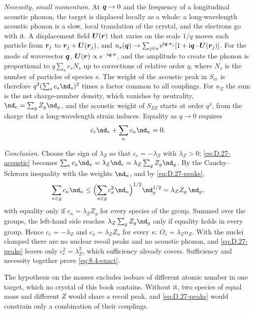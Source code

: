 \emph{Necessity, small momentum.} At $\bm{q} \to 0$ and the frequency of a longitudinal acoustic phonon, the target is displaced locally as a whole: a long-wavelength acoustic phonon is a slow, local translation of the crystal, and the electrons go with it. A displacement field $\bm{U}(\bm{r})$ that varies on the scale $1/q$ moves each particle from $\bm{r}_j$ to $\bm{r}_j + \bm{U}(\bm{r}_j)$, and $n_s(\bm{q}) \to \sum_{j\in s}\mathrm{e}^{\mathrm{i}\bm{q}\cdot\bm{r}_j}[1 + \mathrm{i}\bm{q}\cdot\bm{U}(\bm{r}_j)]$. For the mode of wavevector $\bm{q}$, $\bm{U}(\bm{r}) \propto \mathrm{e}^{-\mathrm{i}\bm{q}\cdot\bm{r}}$, and the amplitude to create the phonon is proportional to $q\sum_sc_sN_s$ up to corrections of relative order $q$, where $N_s$ is the number of particles of species $s$. The weight of the acoustic peak in $S_{cc}$ is therefore $q^2(\sum_sc_s\nd_s)^2$ times a factor common to all couplings. For $n_Z$ the sum is the net charge-number density, which vanishes by neutrality, $\nd_e = \sum_gZ_g\nd_g$, and the acoustic weight of $S_{ZZ}$ starts at order $q^4$, from the charge that a long-wavelength strain induces. Equality as $q \to 0$ requires
\begin{equation}
  c_e\nd_e + \sum_\kappa c_\kappa\nd_\kappa = 0 .
  \label{eq:D.27-acoustic}
\end{equation}

\emph{Conclusion.} Choose the sign of $\lambda_Z$ so that $c_e = -\lambda_Z$ with $\lambda_Z > 0$; \cref{eq:D.27-acoustic} becomes $\sum_\kappa c_\kappa\nd_\kappa = \lambda_Z\nd_e = \lambda_Z\sum_gZ_g\nd_g$. By the Cauchy--Schwarz inequality with the weights $\nd_\kappa$, and by \cref{eq:D.27-peaks},
\begin{equation*}
  \sum_{\kappa\in g}c_\kappa\nd_\kappa \le \Bigl(\sum_{\kappa\in g}c_\kappa^2\nd_\kappa\Bigr)^{1/2}\nd_g^{1/2} = \lambda_ZZ_g\,\nd_g ,
\end{equation*}
with equality only if $c_\kappa = \lambda_ZZ_g$ for every species of the group. Summed over the groups, the left-hand side reaches $\lambda_Z\sum_gZ_g\nd_g$ only if equality holds in every group. Hence $c_e = -\lambda_Z$ and $c_\kappa = \lambda_ZZ_\kappa$ for every $\kappa$: $O_c = \lambda_Zn_Z$. With the nuclei clamped there are no nuclear recoil peaks and no acoustic phonon, and \cref{eq:D.27-peaks} leaves only $c_e^2 = \lambda_Z^2$, which sufficiency already covers. Sufficiency and necessity together prove \cref{eq:8.4-exact}.

The hypothesis on the masses excludes isobars of different atomic number in one target, which no crystal of this book contains. Without it, two species of equal mass and different $Z$ would share a recoil peak, and \cref{eq:D.27-peaks} would constrain only a combination of their couplings.

